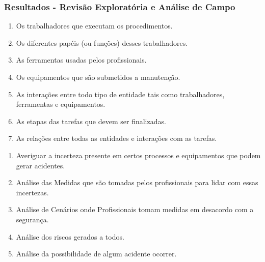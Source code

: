 \documentclass{beamer}
\begin{document}
\begin{frame}
	\frametitle{Resultados - Revisão Exploratória e Análise de Campo}
	\begin{minipage}[t]{0.48\linewidth}
		\begin{enumerate}
			\item {\footnotesize Os trabalhadores que executam os procedimentos.}
			\item {\footnotesize Os diferentes papéis (ou funções) desses trabalhadores.}
			\item {\footnotesize As ferramentas usadas pelos profissionais.}
			\item {\footnotesize Os equipamentos que são submetidos a manutenção.}
			\item {\footnotesize As interações entre todo tipo de entidade tais como trabalhadores, ferramentas e equipamentos.}
			\item {\footnotesize As etapas das tarefas que devem ser finalizadas.}
			\item {\footnotesize As relações entre todas as entidades e interações com as tarefas.} 			
		\end{enumerate}
	\end{minipage}\hfill
	\begin{minipage}[t]{0.48\linewidth}
		\begin{enumerate}
			\item {\footnotesize Averiguar a incerteza presente em certos processos e equipamentos que podem gerar acidentes.}
			\item {\footnotesize Análise das Medidas que são tomadas pelos profissionais para lidar com essas incertezas.}
			\item {\footnotesize Análise de Cenários onde Profissionais tomam medidas em desacordo com a segurança.}
			\item {\footnotesize Análise dos riscos gerados a todos.}
			\item {\footnotesize Análise da possibilidade de algum acidente ocorrer.}
		\end{enumerate}
	\end{minipage}
\end{frame}
\end{document}
